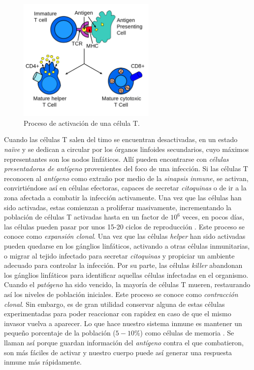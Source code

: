 \begin{figure}[t]
	\centering
	\includegraphics[width=0.6\textwidth]{Imagenes/EstadoDeLaCuestion/Antigen_presentation}
	\caption{Proceso de activación de una célula T.}
	\label{fig:antigen_presentation}
\end{figure}


Cuando las células T salen del timo se encuentran desactivadas, en un estado \textit{naïve} y se dedican a circular por los órganos linfoides secundarios, cuyo máximos representantes son los nodos linfáticos. Allí pueden encontrarse con \textit{células presentadoras de antígeno} provenientes del foco de una infección. Si las células T reconocen al \textit{antígeno} como extraño por medio de la \textit{sinapsis inmune}, se activan, convirtiéndose así en células efectoras, capaces de secretar \textit{citoquinas} o de ir a la zona afectada a combatir la infección activamente. Una vez que las células han sido activadas, estas comienzan a proliferar masivamente, incrementando la población de células T activadas hasta en un factor de $10^6$ veces, en pocos días, las células pueden pasar por unos 15-20 ciclos de reproducción \citep{JTB}. Este proceso se conoce como \textit{expansión clonal}. Una vez que las células \textit{helper} han sido activadas pueden quedarse en los gánglios linfáticos, activando a otras células inmunitarias, o migrar al tejido infectado para secretar \textit{citoquinas} y propiciar un ambiente adecuado para controlar la infección. Por su parte, las células \textit{killer} abandonan los gánglios linfáticos para identificar aquellas células infectadas en el organismo. Cuando el \textit{patógeno} ha sido vencido, la mayoría de células T mueren, restaurando así los niveles de población iniciales. Este proceso se conoce como \textit{contracción clonal}. Sin embargo, es de gran utilidad conservar alguna de estas células experimentadas para poder reaccionar con rapidez en caso de que el mismo invasor vuelva a aparecer. Lo que hace nuestro sistema inmune es mantener un pequeño porcentaje de la población  ($5-10\%$) como células de memoria \citep{JTB}. Se llaman así porque guardan información del \textit{antígeno} contra el que combatieron, son más fáciles de activar y nuestro cuerpo puede así generar una respuesta inmune más rápidamente.

